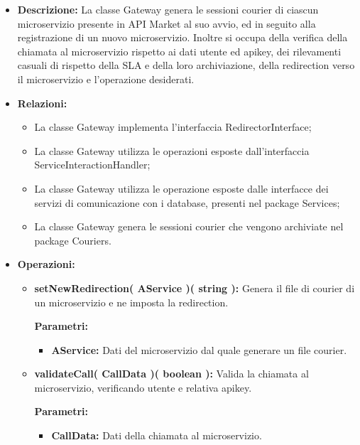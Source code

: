 \begin{itemize}
	\item \textbf{Descrizione:} La classe Gateway genera le sessioni courier di ciascun microservizio presente in API Market al suo avvio, ed in seguito alla registrazione di un nuovo microservizio. Inoltre si occupa della verifica della chiamata al microservizio rispetto ai dati utente ed apikey, dei rilevamenti casuali di rispetto della SLA e della loro archiviazione, della redirection verso il microservizio e l'operazione desiderati.
	\item \textbf{Relazioni:}
		\begin{itemize}
			\item La classe Gateway implementa l'interfaccia RedirectorInterface;
			\item La classe Gateway utilizza le operazioni esposte dall'interfaccia ServiceInteractionHandler;
			\item La classe Gateway utilizza le operazione esposte dalle interfacce dei servizi di comunicazione con i database, presenti nel package Services;
			\item La classe Gateway genera le sessioni courier che vengono archiviate nel package Couriers.
		\end{itemize}
	\item \textbf{Operazioni:}
		\begin{itemize}
			\item \textbf{setNewRedirection( AService )( string ):} Genera il file di courier di un microservizio e ne imposta la redirection.
				\begin{description}
    				\item[\textbf{Parametri:}]
				\end{description}
				\begin{itemize}
					\item \textbf{AService:} Dati del microservizio dal quale generare un file courier. 
				\end{itemize}
			\item \textbf{validateCall( CallData )( boolean ):} Valida la chiamata al microservizio, verificando utente e relativa apikey. 
				\begin{description}
    				\item[\textbf{Parametri:}]
				\end{description}
				\begin{itemize}
					\item \textbf{CallData:} Dati della chiamata al microservizio.
				\end{itemize}

\end{itemize}
\end{itemize}
